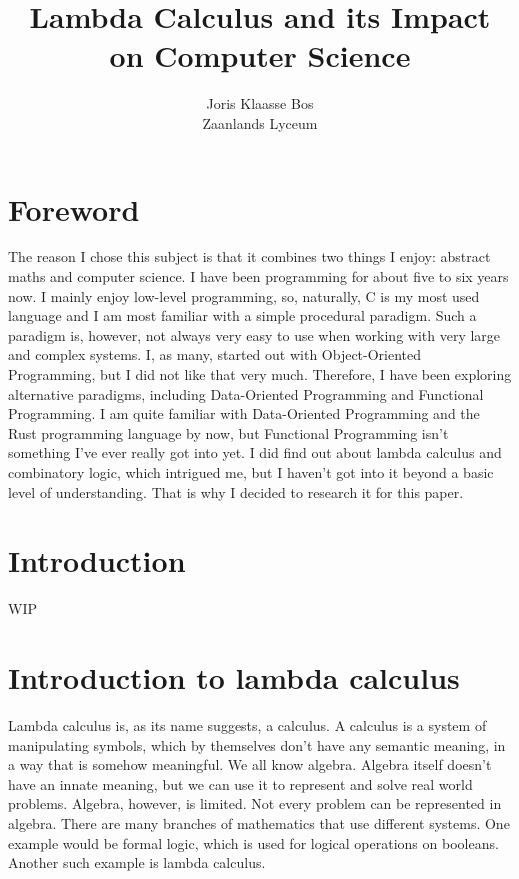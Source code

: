 \documentclass[a4paper]{article}
\title{Lambda Calculus and its Impact on Computer Science}
\author{Joris Klaasse Bos\\ Zaanlands Lyceum}
\begin{document}
\maketitle
\newpage
\tableofcontents
\newpage

\section{Foreword}

The reason I chose this subject is that it combines two things I enjoy:
abstract maths and computer science. I have been programming for about five to
six years now. I mainly enjoy low-level programming, so, naturally, C is my
most used language and I am most familiar with a simple procedural paradigm.
Such a paradigm is, however, not always very easy to use when working with very
large and complex systems. I, as many, started out with Object-Oriented
Programming, but I did not like that very much. Therefore, I have been
exploring alternative paradigms, including Data-Oriented Programming and
Functional Programming. I am quite familiar with Data-Oriented Programming and
the Rust programming language by now, but Functional Programming isn't
something I've ever really got into yet. I did find out about lambda calculus
and combinatory logic, which intrigued me, but I haven’t got into it beyond a
basic level of understanding. That is why I decided to research it for this
paper. 

\section{Introduction}


WIP

\section{Introduction to lambda calculus}

Lambda calculus is, as its name suggests, a calculus. A calculus is a system of
manipulating symbols, which by themselves don't have any semantic meaning, in a
way that is somehow meaningful. We all know algebra. Algebra itself doesn't
have an innate meaning, but we can use it to represent and solve real world
problems. Algebra, however, is limited. Not every problem can be represented in
algebra. There are many branches of mathematics that use different systems.
One example would be formal logic, which is used for logical operations on
booleans. Another such example is lambda calculus.
\end{document}
